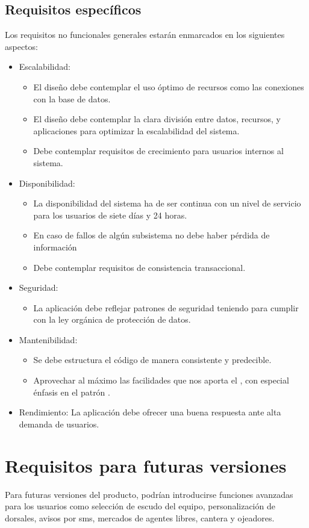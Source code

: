 \subsection{Requisitos específicos}
Los requisitos no funcionales generales estarán enmarcados en los siguientes
aspectos:
\begin{itemize}
\item Escalabilidad:
  \begin{itemize}
  \item El diseño debe contemplar el uso óptimo de recursos como las conexiones
    con la base de datos.
  \item El diseño debe contemplar la clara división entre datos, recursos, y
    aplicaciones para optimizar la escalabilidad del sistema.
  \item Debe contemplar requisitos de crecimiento para usuarios internos al
    sistema.
  \end{itemize}
\item Disponibilidad:
  \begin{itemize}
  \item La disponibilidad del sistema ha de ser continua con un nivel de
    servicio para los usuarios de siete días y 24 horas.
  \item En caso de fallos de algún subsistema no debe haber pérdida de
    información
  \item Debe contemplar requisitos de consistencia transaccional.
  \end{itemize}
\item Seguridad:
  \begin{itemize}
  \item La aplicación debe reflejar patrones de seguridad teniendo para cumplir
    con la ley orgánica de protección de datos.
  \end{itemize}
\item Mantenibilidad:
  \begin{itemize}
  \item Se debe estructura el código de manera consistente y predecible.
  \item Aprovechar al máximo las facilidades que nos aporta el
    , con especial énfasis en el patrón
    .
  \end{itemize}
\item Rendimiento: La aplicación debe ofrecer una buena respuesta ante alta
  demanda de usuarios.
\end{itemize}
\section{Requisitos para futuras versiones}
Para futuras versiones del producto, podrían introducirse funciones avanzadas
para los usuarios como selección de escudo del equipo, personalización de
dorsales, avisos por sms, mercados de agentes libres, cantera y ojeadores.

